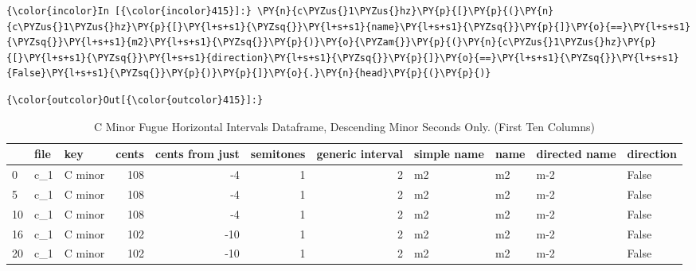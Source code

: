     \begin{Verbatim}[commandchars=\\\{\}]
{\color{incolor}In [{\color{incolor}415}]:} \PY{n}{c\PYZus{}1\PYZus{}hz}\PY{p}{[}\PY{p}{(}\PY{n}{c\PYZus{}1\PYZus{}hz}\PY{p}{[}\PY{l+s+s1}{\PYZsq{}}\PY{l+s+s1}{name}\PY{l+s+s1}{\PYZsq{}}\PY{p}{]}\PY{o}{==}\PY{l+s+s1}{\PYZsq{}}\PY{l+s+s1}{m2}\PY{l+s+s1}{\PYZsq{}}\PY{p}{)}\PY{o}{\PYZam{}}\PY{p}{(}\PY{n}{c\PYZus{}1\PYZus{}hz}\PY{p}{[}\PY{l+s+s1}{\PYZsq{}}\PY{l+s+s1}{direction}\PY{l+s+s1}{\PYZsq{}}\PY{p}{]}\PY{o}{==}\PY{l+s+s1}{\PYZsq{}}\PY{l+s+s1}{False}\PY{l+s+s1}{\PYZsq{}}\PY{p}{)}\PY{p}{]}\PY{o}{.}\PY{n}{head}\PY{p}{(}\PY{p}{)}
\end{Verbatim}
\begin{Verbatim}[commandchars=\\\{\}]
{\color{outcolor}Out[{\color{outcolor}415}]:} 
\end{Verbatim}
\begin{singlespace}
\begin{table}[H]
\centering
\tiny
\begin{tabular}{|lllrrrrllll|}
\hline
\textbf{{}} & \textbf{file} & \textbf{     key} & \textbf{ cents} & \textbf{ cents from just} & \textbf{ semitones} & \textbf{ generic interval} & \textbf{simple name} & \textbf{name} & \textbf{directed name} & \textbf{direction }\\
\hline
0  &  c\_1 &  C minor &    108 &               -4 &          1 &                 2 &          m2 &   m2 &           m-2 &     False \\
5  &  c\_1 &  C minor &    108 &               -4 &          1 &                 2 &          m2 &   m2 &           m-2 &     False \\
10 &  c\_1 &  C minor &    108 &               -4 &          1 &                 2 &          m2 &   m2 &           m-2 &     False \\
16 &  c\_1 &  C minor &    102 &              -10 &          1 &                 2 &          m2 &   m2 &           m-2 &     False \\
20 &  c\_1 &  C minor &    102 &              -10 &          1 &                 2 &          m2 &   m2 &           m-2 &     False \\
\hline
\end{tabular}
\caption[C minor Fugue Horizontal Intervals Dataframe, Descending Minor Seconds Only. ]{C Minor Fugue Horizontal Intervals Dataframe, Descending Minor Seconds Only. (First Ten Columns)}
\end{table}
\normalsize
\end{singlespace}

